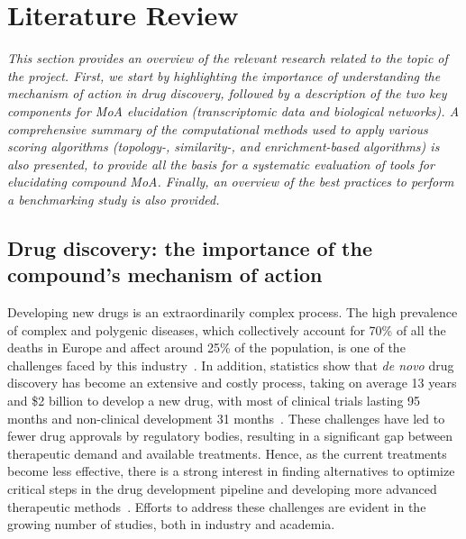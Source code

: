 ﻿%

%

\chapter{Literature Review}
\label{cha:literature_review}

\textit{This section provides an overview of the relevant research related to the topic of the project. 
First, we start by highlighting the importance of understanding the mechanism of action in drug discovery, followed by a description of the two key components for MoA elucidation (transcriptomic data and biological networks). 
A comprehensive summary of the computational methods used to apply various scoring algorithms (topology-, similarity-, and enrichment-based algorithms) is also presented, to provide all the basis for a systematic evaluation of tools for elucidating compound MoA. 
Finally, an overview of the best practices to perform a benchmarking study is also provided.}

\section{Drug discovery: the importance of the compound's mechanism of action} %
\label{sec:drug_discovery_the_importance_of_the_compounds_mechanism_of_action}

Developing new drugs is an extraordinarily complex process. 
The high prevalence of complex and polygenic diseases, which collectively account for 70\% of all the deaths in Europe and affect around 25\% of the population, is one of the challenges faced by this industry~\cite{RN43}. 
In addition, statistics show that \textit{de novo} drug discovery has become an extensive and costly process, taking on average 13 years and \$2 billion to develop a new drug, with most of clinical trials lasting 95 months and non-clinical development 31 months~\cite{RN55,RN56,RN47}. 
These challenges have led to fewer drug approvals by regulatory bodies, resulting in a significant gap between therapeutic demand and available treatments. Hence, as the current treatments become less effective, there is a strong interest in finding alternatives to optimize critical steps in the drug development pipeline and developing more advanced therapeutic methods~\cite{RN44}. 
Efforts to address these challenges are evident in the growing number of studies, both in industry and academia.

